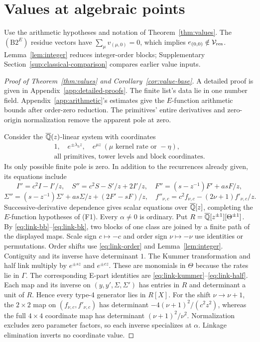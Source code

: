 \section{Values at algebraic points}\label{sec:values}
Use the arithmetic hypotheses and notation of Theorem~\ref{thm:values}.
The $(\mathrm{B2}^E)$ residue vectors have
$\sum_\mu v_{(\mu,0)}=0$, which implies $e_{(0,0)}\notin\mathcal V_{\rm res}$.
Lemma~\ref{lem:integer} reduces integer-order blocks; Supplementary Section~\ref{sup:classical-comparison} compares earlier value inputs.

\begin{proof}[Proof of Theorem~\ref{thm:values} and Corollary~\ref{cor:value-base}]
A detailed proof is given in Appendix~\ref{app:detailed-proofs}.
The finite list's data lie in one number field.
Appendix~\ref{app:arithmetic}'s estimates give the $E$-function arithmetic bounds
after order-zero reduction. The primitives' entire derivatives and
zero-origin normalization remove the apparent pole at zero.

Consider the ${\overline{\mathbb{Q}}}(z)$-linear system with coordinates
\begin{equation}\label{eq:value-system}
\begin{gathered}
1,\quad e^{\pm\lambda_hz},\quad e^{\mu z}\ (\mu\text{ kernel rate or }-\eta),\\
\text{all primitives, tower levels and block coordinates}.
\end{gathered}
\end{equation}
Its only possible finite pole is zero. In addition to the recurrences
already given, its equations include
\[
I''=c^2I-I'/z,\quad S''=c^2S-S'/z+2I'/z,\quad
F''=(s-z^{-1})F'+asF/z,
\]
\[
\Sigma''=(s-z^{-1})\Sigma'+as\Sigma/z+(2F'-sF)/z,\quad
f''_{\nu,c}=c^2f_{\nu,c}-(2\nu+1)f'_{\nu,c}/z.
\]
Successive-derivative dependence gives scalar equations over ${\overline{\mathbb{Q}}}[z]$,
completing the $E$-function hypotheses of (F1).
Every $\alpha\ne0$ is ordinary. Put $R={\overline{\mathbb{Q}}}[z^{\pm1}][\Theta^{\pm1}]$.
By \eqref{eq:link-bb}--\eqref{eq:link-bk}, two blocks of one class are
joined by a finite path of the displayed maps.
Scale sign $c\mapsto-c$ and order sign $\nu\mapsto-\nu$ use
identities or permutations.
Order shifts use \eqref{eq:link-order} and Lemma~\ref{lem:integer}.
Contiguity and its inverse have determinant $1$.
The Kummer transformation and half link multiply by $e^{\pm sz}$ and
$e^{\pm cz}$. These are monomials in $\Theta$ because the rates lie
in $\Gamma$.
The corresponding E-part identities are
\eqref{eq:link-kummer}--\eqref{eq:link-half}.
Each map and its inverse on $(y,y',\Sigma,\Sigma')$ has entries in $R$
and determinant a unit of $R$. Hence every type-4 generator lies in $R[X]$.
For the shift $\nu\to\nu+1$, the $2\times2$ map on $(f_{\nu,c},f'_{\nu,c})$ has
determinant $-4(\nu+1)^2/(c^2z^2)$, whereas the full $4\times4$
coordinate map has determinant $(\nu+1)^2/\nu^2$.
Normalization excludes zero parameter factors, so each inverse specializes at $\alpha$.
Linkage elimination inverts no coordinate value.


\end{proof}
